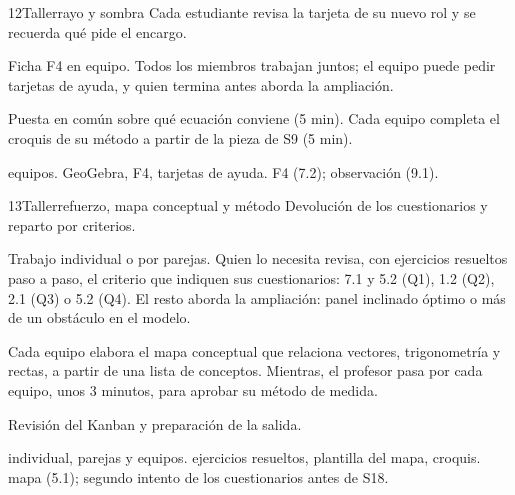 \begin{sesionbox}{12}{Taller}{rayo y sombra}
 Cada estudiante revisa la tarjeta de su nuevo rol y se recuerda qué pide el encargo.

 Ficha F4 en equipo. Todos los miembros trabajan juntos; el equipo puede pedir tarjetas de ayuda, y quien termina antes aborda la ampliación.

 Puesta en común sobre qué ecuación conviene (5 min). Cada equipo completa el croquis de su método a partir de la pieza de S9 (5 min).

 equipos.  GeoGebra, F4, tarjetas de ayuda.  F4 (7.2); observación (9.1).
\end{sesionbox}

\begin{sesionbox}{13}{Taller}{refuerzo, mapa conceptual y método}
 Devolución de los cuestionarios y reparto por criterios.

 Trabajo individual o por parejas. Quien lo necesita revisa, con ejercicios resueltos paso a paso, el criterio que indiquen sus cuestionarios: 7.1 y 5.2 (Q1), 1.2 (Q2), 2.1 (Q3) o 5.2 (Q4). El resto aborda la ampliación: panel inclinado óptimo o más de un obstáculo en el modelo.

 Cada equipo elabora el mapa conceptual que relaciona vectores, trigonometría y rectas, a partir de una lista de conceptos. Mientras, el profesor pasa por cada equipo, unos 3 minutos, para aprobar su método de medida.

 Revisión del Kanban y preparación de la salida.

 individual, parejas y equipos.  ejercicios resueltos, plantilla del mapa, croquis.  mapa (5.1); segundo intento de los cuestionarios antes de S18.
\end{sesionbox}

